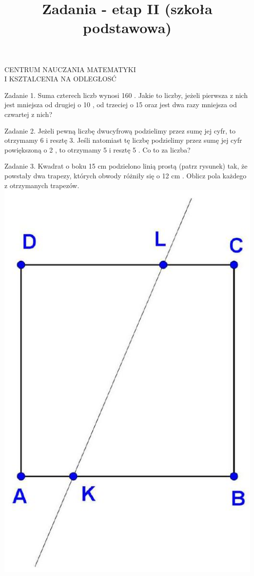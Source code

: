 \documentclass[10pt]{article}
\title{Zadania - etap II (szkoła podstawowa) }
\author{}
\date{}
\begin{document}
\maketitle
CENTRUM NAUCZANIA MATEMATYKI\\
I KSZTALCENIA NA ODLEGŁOSĆ

Zadanie 1. Suma czterech liczb wynosi 160 . Jakie to liczby, jeżeli pierwsza z nich jest mniejsza od drugiej o 10 , od trzeciej o 15 oraz jest dwa razy mniejsza od czwartej z nich?

Zadanie 2. Jeżeli pewną liczbę dwucyfrową podzielimy przez sumę jej cyfr, to otrzymamy 6 i resztę 3. Jeśli natomiast tę liczbę podzielimy przez sumę jej cyfr powiększoną o 2 , to otrzymamy 5 i resztę 5 . Co to za liczba?

Zadanie 3. Kwadrat o boku 15 cm podzielono linią prostą (patrz rysunek) tak, że powstały dwa trapezy, których obwody różniły się o 12 cm . Oblicz pola każdego z otrzymanych trapezów.\\
\includegraphics[max width=\textwidth, center]{2024_11_21_37063edf61ec0399ce4dg-1}
\end{document}
